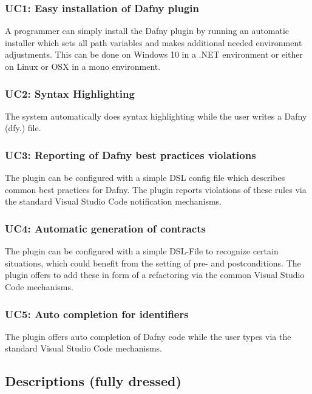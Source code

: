 \subsubsection{UC1: Easy installation of Dafny plugin}
A programmer can simply install the Dafny plugin by running an automatic installer which sets all path variables and makes additional needed environment adjustments. This can be done on Windows 10 in a .NET environment or either on Linux or OSX in a mono environment.
\subsubsection{UC2: Syntax Highlighting}
The system automatically does syntax highlighting while the user writes a Dafny (dfy.) file.
\subsubsection{UC3: Reporting of Dafny best practices violations}
The plugin can be configured with a simple DSL config file which describes common best practices for Dafny. The plugin reports violations of these rules via the standard Visual Studio Code notification mechanisms.
\subsubsection{UC4: Automatic generation of contracts}
The plugin can be configured with a simple DSL-File to recognize certain situations, which could benefit from the setting of pre- and postconditions. The plugin offers to add these in form of a refactoring via the common Visual Studio Code mechanisms.

\subsubsection{UC5: Auto completion for identifiers}
The plugin offers auto completion of Dafny code while the user types via the standard Visual Studio Code mechanisms.
\subsection{Descriptions (fully dressed)}

